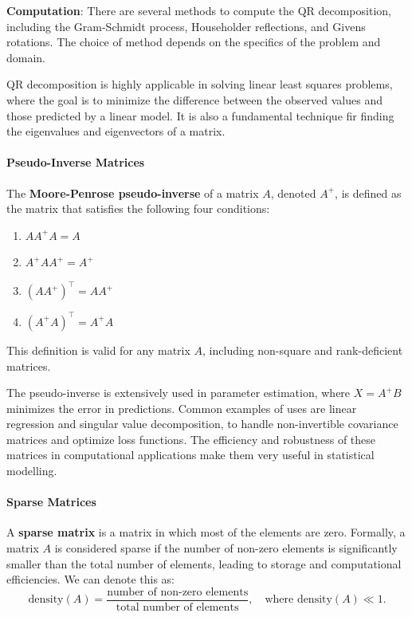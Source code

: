 \documentclass[12pt, twoside,hidelinks]{article}
\theoremstyle{definition}
\numberwithin{equation}{section}
\begin{document}
\textbf{Computation}: There are several methods to compute the QR decomposition, including the Gram-Schmidt process, Householder reflections, and Givens rotations. The choice of method depends on the specifics of the problem and domain.

QR decomposition is highly applicable in solving linear least squares problems, where the goal is to minimize the difference between the observed values and those predicted by a linear model. It is also a fundamental technique fir finding the eigenvalues and eigenvectors of a matrix.


\paragraph{Pseudo-Inverse Matrices}

The \textbf{Moore-Penrose pseudo-inverse} of a matrix \( A \), denoted \( A^{+} \), is defined as the matrix that satisfies the following four conditions:
\begin{enumerate}
\item \( A A^{+} A = A \)
\item \( A^{+} A A^{+} = A^{+} \)
\item \( (A A^{+})^{\top} = A A^{+} \)
\item \( (A^{+} A)^{\top} = A^{+} A \)
\end{enumerate}
This definition is valid for any matrix \( A \), including non-square and rank-deficient matrices.

The pseudo-inverse is extensively used in parameter estimation, where $X = A^{+}B$ minimizes the error in predictions. Common examples of uses are linear regression and singular value decomposition, to handle non-invertible covariance matrices and optimize loss functions. The efficiency and robustness of these matrices in computational applications make them very useful in statistical modelling.

\paragraph{Sparse Matrices}

A \textbf{sparse matrix} is a matrix in which most of the elements are zero. Formally, a matrix \( A \) is considered sparse if the number of non-zero elements is significantly smaller than the total number of elements, leading to storage and computational efficiencies. We can denote this as:
\[
\text{{density}}(A) = \frac{\text{{number of non-zero elements}}}{\text{{total number of elements}}}, \quad \text{{where }} \text{{density}}(A) \ll 1.
\]
\end{document}
